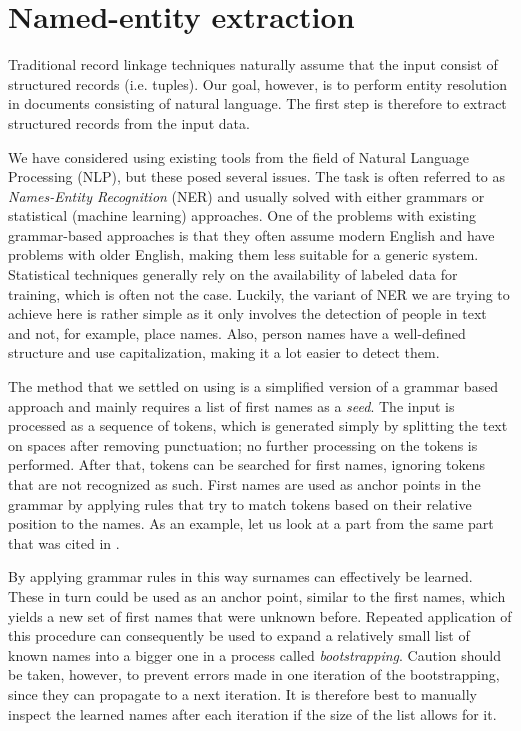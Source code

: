 

\section{Named-entity extraction}
\label{sec:segmentation}

Traditional record linkage techniques naturally assume that the input consist of structured records (i.e. tuples).
Our goal, however, is to perform entity resolution in documents consisting of natural language.
The first step is therefore to extract structured records from the input data.

We have considered using existing tools from the field of Natural Language Processing (NLP), but these posed several issues.
The task is often referred to as \emph{Names-Entity Recognition} (NER) and usually solved with either grammars or statistical (machine learning) approaches.
One of the problems with existing grammar-based approaches is that they often assume modern English and have problems with older English, making them less suitable for a generic system.
Statistical techniques generally rely on the availability of labeled data for training, which is often not the case.
Luckily, the variant of NER we are trying to achieve here is rather simple as it only involves the detection of people in text and not, for example, place names.
Also, person names have a well-defined structure and use capitalization, making it a lot easier to detect them.

The method that we settled on using is a simplified version of a grammar based approach and mainly requires a list of first names as a \emph{seed}.
The input is processed as a sequence of tokens, which is generated simply by splitting the text on spaces after removing punctuation; no further processing on the tokens is performed.
After that, tokens can be searched for first names, ignoring tokens that are not recognized as such.
First names are used as anchor points in the grammar by applying rules that try to match tokens based on their relative position to the names.
As an example, let us look at a part from the same part that was cited in .

By applying grammar rules in this way surnames can effectively be learned.
These in turn could be used as an anchor point, similar to the first names, which yields a new set of first names that were unknown before.
Repeated application of this procedure can consequently be used to expand a relatively small list of known names into a bigger one in a process called \emph{bootstrapping}.
Caution should be taken, however, to prevent errors made in one iteration of the bootstrapping, since they can propagate to a next iteration.
It is therefore best to manually inspect the learned names after each iteration if the size of the list allows for it.

